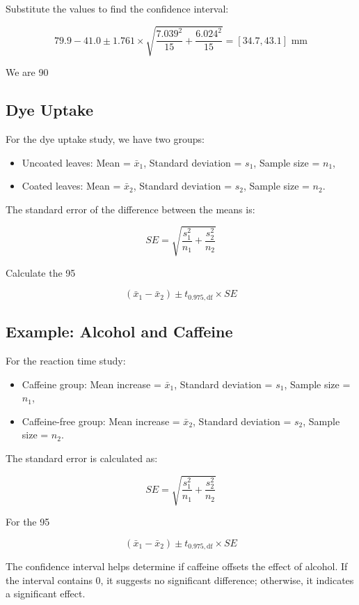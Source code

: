 \documentclass{article}
\begin{document}
Substitute the values to find the confidence interval:

\[
79.9 - 41.0 \pm 1.761 \times \sqrt{\frac{7.039^2}{15} + \frac{6.024^2}{15}} = [34.7, 43.1] \text{ mm}
\]

We are 90%

\subsection{Dye Uptake}

For the dye uptake study, we have two groups:
\begin{itemize}
    \item Uncoated leaves: Mean = \( \bar{x}_1 \), Standard deviation = \( s_1 \), Sample size = \( n_1 \),
    \item Coated leaves: Mean = \( \bar{x}_2 \), Standard deviation = \( s_2 \), Sample size = \( n_2 \).
\end{itemize}

The standard error of the difference between the means is:

\[
SE = \sqrt{\frac{s_1^2}{n_1} + \frac{s_2^2}{n_2}}
\]

Calculate the 95%

\[
(\bar{x}_1 - \bar{x}_2) \pm t_{0.975, \text{df}} \times SE
\]

\subsection{Example: Alcohol and Caffeine}

For the reaction time study:
\begin{itemize}
    \item Caffeine group: Mean increase = \( \bar{x}_1 \), Standard deviation = \( s_1 \), Sample size = \( n_1 \),
    \item Caffeine-free group: Mean increase = \( \bar{x}_2 \), Standard deviation = \( s_2 \), Sample size = \( n_2 \).
\end{itemize}

The standard error is calculated as:

\[
SE = \sqrt{\frac{s_1^2}{n_1} + \frac{s_2^2}{n_2}}
\]

For the 95%

\[
(\bar{x}_1 - \bar{x}_2) \pm t_{0.975, \text{df}} \times SE
\]

The confidence interval helps determine if caffeine offsets the effect of alcohol. If the interval contains 0, it suggests no significant difference; otherwise, it indicates a significant effect.
\end{document}
